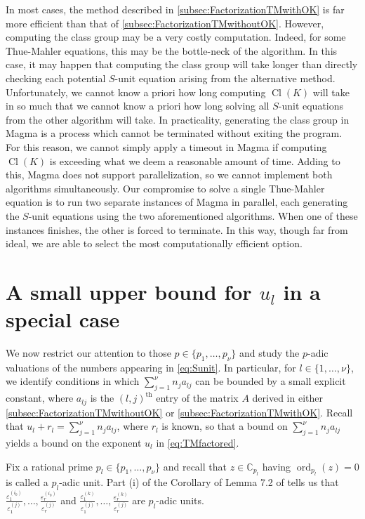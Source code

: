 \documentclass[11pt]{report}
\theoremstyle{definition}
\DeclareMathOperator{\ord}{ord}
\DeclareMathOperator{\Cl}{Cl}
\newcommand{\eps}{\varepsilon}
\begin{document}
In most cases, the method described in \autoref{subsec:FactorizationTMwithOK} is far more efficient than that of \autoref{subsec:FactorizationTMwithoutOK}. However, computing the class group may be a very costly computation. Indeed, for some Thue-Mahler equations, this may be the bottle-neck of the algorithm. In this case, it may happen that computing the class group will take longer than directly checking each potential $S$-unit equation arising from the alternative method. Unfortunately, we cannot know a priori how long computing $\Cl(K)$ will take in so much that we cannot know a priori how long solving all $S$-unit equations from the other algorithm will take. In practicality, generating the class group in Magma is a process which cannot be terminated without exiting the program. For this reason, we cannot simply apply a timeout in Magma if computing $\Cl(K)$ is exceeding what we deem a reasonable amount of time. Adding to this, Magma does not support parallelization, so we cannot implement both algorithms simultaneously. Our compromise to solve a single Thue-Mahler equation is to run two separate instances of Magma in parallel, each generating the $S$-unit equations using the two aforementioned algorithms. When one of these instances finishes, the other is forced to terminate. In this way, though far from ideal, we are able to select the most computationally efficient option.


\section{A small upper bound for $u_l$ in a special case}
\label{sec:SmallBoundForSpecialCase}

We now restrict our attention to those $p \in \{p_1, \dots, p_{\nu}\}$ and study the $p$-adic valuations of the numbers appearing in \eqref{eq:Sunit}. In particular, for $l \in \{1, \dots, \nu\}$, we identify conditions in which $\sum_{j = 1}^{\nu} n_ja_{lj}$ can be bounded by a small explicit constant, where $a_{lj}$ is the $(l,j)^{\text{th}}$ entry of the matrix $A$ derived in either \autoref{subsec:FactorizationTMwithoutOK} or \autoref{subsec:FactorizationTMwithOK}. Recall that $u_l + r_l = \sum_{j = 1}^{\nu} n_ja_{lj}$, where $r_l$ is known, so that a bound on $\sum_{j = 1}^{\nu} n_ja_{lj}$ yields a bound on the exponent $u_l$ in \eqref{eq:TMfactored}.

Fix a rational prime $p_l \in \{p_1, \dots, p_{\nu}\}$ and recall that $z \in \mathbb{C}_{p_l}$ having $\ord_{p_l}(z) = 0$ is called a $p_l$-adic unit. Part (i) of the Corollary of Lemma 7.2 of \cite{TW3} tells us that $\frac{\eps_1^{(i_0)}}{\varepsilon_1^{(j)}}, \dots, \frac{\eps_r^{(i_0)}}{\varepsilon_r^{(j)}}$ and $\frac{\varepsilon_1^{(k)}}{\varepsilon_1^{(j)}}, \dots, \frac{\varepsilon_r^{(k)}}{\varepsilon_r^{(j)}}$ are $p_l$-adic units.
\end{document}

